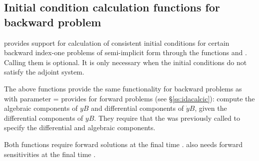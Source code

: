 \subsection{Initial condition calculation functions for backward problem}
\label{sss:idacalcicB}

{\idas} provides support for calculation of consistent initial
conditions for certain backward index-one problems of semi-implicit form through
the functions  and . Calling them is
optional. It is only necessary when the initial conditions do not satisfy
the adjoint system.

The above functions provide the same functionality for backward problems as
 with parameter  =  
provides for forward problems (see \S\ref{ss:idacalcic}): compute the
algebraic components of $yB$ and differential  components of $\dot{y}B$, given
the differential components of $yB$.  They require that the 
was previously called to specify the differential and algebraic components.


Both functions require forward solutions at the final time .
 also needs forward sensitivities at the final time .

